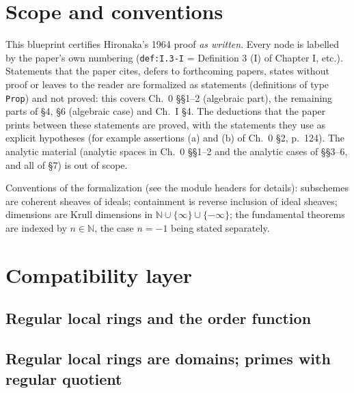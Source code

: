 %



\chapter*{Scope and conventions}

This blueprint certifies Hironaka's 1964 proof \emph{as written}.  Every node is labelled
by the paper's own numbering (\texttt{def:I.3-I} = Definition 3 (I) of Chapter I, etc.).
Statements that the paper cites, defers to forthcoming papers, states without proof or leaves
to the reader are formalized as statements (definitions of type \texttt{Prop}) and not
proved: this covers Ch.~0 \S\S1--2 (algebraic part), the remaining parts of \S4, \S6
(algebraic case) and Ch.~I \S4.  The deductions that the paper prints between these statements are
proved, with the statements they use as explicit hypotheses (for example assertions (a) and (b) of
Ch.~0 \S2, p.~124).  The analytic material (analytic spaces in Ch.~0 \S\S1--2
and the analytic cases of \S\S3--6, and all of \S7) is out of scope.

Conventions of the formalization (see the module headers for details): subschemes are
coherent sheaves of ideals; containment is reverse inclusion of ideal sheaves; dimensions
are Krull dimensions in $\mathbb N\cup\{\infty\}\cup\{-\infty\}$; the fundamental theorems
are indexed by $n\in\mathbb N$, the case $n=-1$ being stated separately.

\chapter{Compatibility layer}

\section{Regular local rings and the order function}

\section{Regular local rings are domains; primes with regular quotient}

